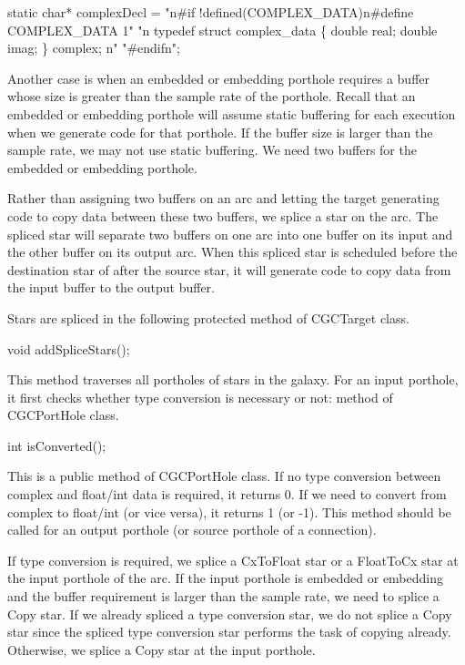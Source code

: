 {\begin{example}
static char* complexDecl =
"\back n#if !defined(COMPLEX_DATA)\back n#define COMPLEX_DATA 1"
"\back n typedef struct complex_data \{ double real; double imag; \} complex; \back n"
"#endif\back n";
\end{example}

Another case is when an embedded or embedding porthole requires a buffer
whose size is greater than the sample rate of the porthole. Recall that
an embedded or embedding porthole will assume static buffering for
each execution when we generate code for that porthole. If the buffer 
size is larger than the sample rate, we may not use static buffering. 
We need two buffers for the embedded or embedding porthole.

Rather than assigning two buffers on an arc and letting the target
generating code to copy data between these two buffers, we splice
a star on the arc. The spliced star will separate two buffers on one arc
into one buffer on its input and the other buffer on its output arc.
When this spliced star is scheduled before the destination star of after
the source star,
it will generate code to copy data from the input buffer to the output buffer.

Stars are spliced in the following protected method of CGCTarget class.

\begin{example}
void addSpliceStars();
\end{example}

This method traverses all portholes of stars in the galaxy. For an input
porthole, it first checks whether type conversion is necessary or not:
 method of CGCPortHole class.

\begin{example}
int isConverted();
\end{example}

This is a public method of CGCPortHole class. If no type conversion between
complex and float/int data is required, it returns 0. If we need to convert
from complex to float/int (or vice versa), it returns 1 (or -1). This 
method should be called for an output porthole (or source porthole of a
connection).

If type conversion is required, we splice a CxToFloat star or a FloatToCx
star at the input porthole of the arc. If the input porthole is embedded or
embedding and the buffer requirement is larger than the sample rate, 
we need to splice a Copy star. If we already spliced a type conversion
star, we do not splice a Copy star since the spliced type conversion star
performs the task of copying already. Otherwise, we splice a Copy star at
the input porthole.

}
